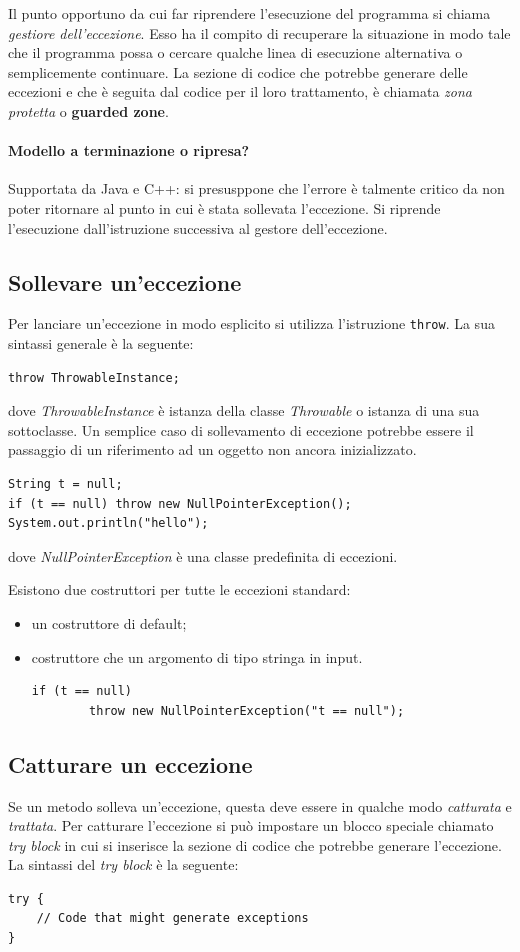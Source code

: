 \documentclass[12pt]{report}
\begin{document}
Il punto opportuno da cui far riprendere l'esecuzione del programma si chiama \textit{gestiore dell'eccezione}. Esso ha il compito di recuperare la situazione in modo tale che il programma possa o cercare qualche linea di esecuzione alternativa o semplicemente continuare.  La sezione di codice che potrebbe generare delle eccezioni e che è seguita dal codice per il loro trattamento, è chiamata \textit{zona protetta} o \textbf{guarded zone}.

\paragraph{Modello a terminazione o ripresa?} Supportata da Java e C++: si presusppone che l'errore è talmente critico da non poter ritornare al punto in cui è stata sollevata l'eccezione. Si riprende l'esecuzione dall'istruzione successiva al gestore dell'eccezione.
\subsection{Sollevare un'eccezione}
Per lanciare un'eccezione in modo esplicito si utilizza l'istruzione \texttt{throw}. La sua sintassi generale è la seguente:
\begin{lstlisting}[style=javastyle]
throw ThrowableInstance;
\end{lstlisting}
dove \textit{ThrowableInstance} è istanza della classe \textit{Throwable} o istanza di una sua sottoclasse. Un semplice caso di sollevamento di eccezione potrebbe essere il passaggio di un riferimento ad un oggetto non ancora inizializzato.
\begin{lstlisting}[style=javastyle]
String t = null;
if (t == null) throw new NullPointerException();
System.out.println("hello");
\end{lstlisting}
dove \textit{NullPointerException} è una classe predefinita di eccezioni.

Esistono due costruttori per tutte le eccezioni standard:
\begin{itemize}
	\item un costruttore di default;
	\item costruttore che un argomento di tipo stringa in input.
	\begin{lstlisting}[style=javastyle]
	if (t == null)
		throw new NullPointerException("t == null");
	\end{lstlisting}
\end{itemize}
\subsection{Catturare un eccezione}
Se un metodo solleva un'eccezione, questa deve essere in qualche modo \textit{catturata} e \textit{trattata}. Per catturare l'eccezione si può impostare un blocco speciale chiamato \textit{try block} in cui si inserisce la sezione di codice che potrebbe generare l'eccezione. La sintassi del \textit{try block} è la seguente:
\begin{lstlisting}[style=javastyle]
try {
	// Code that might generate exceptions
}
\end{lstlisting}
\end{document}
